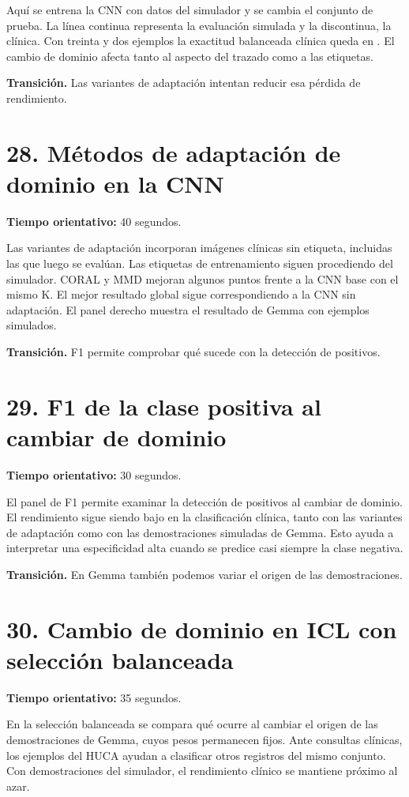 \documentclass[11pt,a4paper]{article}
\begin{document}
Aquí se entrena la CNN con datos del simulador y se cambia el conjunto de prueba. La línea continua representa la evaluación simulada y la discontinua, la clínica. Con treinta y dos ejemplos la exactitud balanceada clínica queda en \TransferCnnLastBA{}. El cambio de dominio afecta tanto al aspecto del trazado como a las etiquetas.

\textbf{Transición.} Las variantes de adaptación intentan reducir esa pérdida de rendimiento.

\section*{28. Métodos de adaptación de dominio en la CNN}
\textbf{Tiempo orientativo: }40 segundos.

Las variantes de adaptación incorporan imágenes clínicas sin etiqueta, incluidas las que luego se evalúan. Las etiquetas de entrenamiento siguen procediendo del simulador. CORAL y MMD mejoran algunos puntos frente a la CNN base con el mismo K. El mejor resultado global sigue correspondiendo a la CNN sin adaptación. El panel derecho muestra el resultado de Gemma con ejemplos simulados.

\textbf{Transición.} F1 permite comprobar qué sucede con la detección de positivos.

\section*{29. F1 de la clase positiva al cambiar de dominio}
\textbf{Tiempo orientativo: }30 segundos.

El panel de F1 permite examinar la detección de positivos al cambiar de dominio. El rendimiento sigue siendo bajo en la clasificación clínica, tanto con las variantes de adaptación como con las demostraciones simuladas de Gemma. Esto ayuda a interpretar una especificidad alta cuando se predice casi siempre la clase negativa.

\textbf{Transición.} En Gemma también podemos variar el origen de las demostraciones.

\section*{30. Cambio de dominio en ICL con selección balanceada}
\textbf{Tiempo orientativo: }35 segundos.

En la selección balanceada se compara qué ocurre al cambiar el origen de las demostraciones de Gemma, cuyos pesos permanecen fijos. Ante consultas clínicas, los ejemplos del HUCA ayudan a clasificar otros registros del mismo conjunto. Con demostraciones del simulador, el rendimiento clínico se mantiene próximo al azar.
\end{document}
